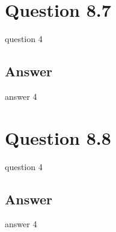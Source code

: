 \documentclass[letterpaper,11pt]{article}
\begin{document}
\noindent\makebox[\linewidth]{\rule{\textwidth}{0.4pt}}

\section*{Question 8.7}
\begin{spverbatim}
question 4
\end{spverbatim}

\subsection*{Answer}
answer 4

\section*{Question 8.8}
\begin{spverbatim}
	question 4
\end{spverbatim}

\subsection*{Answer}
answer 4

\medskip


\end{document}
